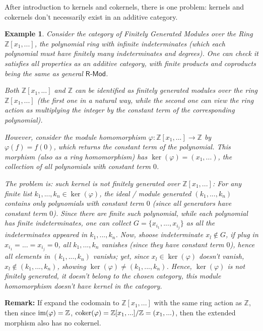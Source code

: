 \documentclass[x11names,reqno,12pt]{extarticle}
\newtheorem{exm}{Example}
\newcommand{\coker}{\textmd{coker}}
\newcommand{\cat}[1]{\textsf{#1}}
\begin{document}
After introduction to kernels and cokernels, there is one problem: kernels and cokernels don't necessarily exist in an additive category.
\begin{exm}
    Consider the category of \emph{Finitely Generated Modules over the Ring $\mathbb{Z}[x_1,...]$}, the polynomial ring with infinite indeterminates (which each polynomial must have finitely many indeterminates and degrees). One can check it satisfies all properties as an additive category, with finite products and coproducts being the same as general $\cat{R-Mod}$.

    \hfil

    Both $\mathbb{Z}[x_1,...]$ and $\mathbb{Z}$ can be identified as finitely generated modules over the ring $\mathbb{Z}[x_1,...]$ (the first one in a natural way, while the second one can view the ring action as multiplying the integer by the constant term of the corresponding polynomial).

    However, consider the module homomorphism $\varphi:\mathbb{Z}[x_1,...]\rightarrow \mathbb{Z}$ by $\varphi(f) = f(0)$, which returns the constant term of the polynomial.
    This morphism (also as a ring homomorphism) has $\ker(\varphi)=(x_1,...)$, the collection of all polynomials with constant term $0$.

    \hfil

    The problem is: such kernel is not finitely generated over $\mathbb{Z}[x_1,...]$: For any finite list $k_1,...,k_n\in \ker(\varphi)$, the ideal / module generated $(k_1,...,k_n)$ contains only polynomials with constant term $0$ (since all generators have constant term $0$). Since there are finite such polynomial, while each polynomial has finite indeterminates, one can collect $G=\{x_{i_1},...,x_{i_j}\}$ as all the indeterminates appeared in $k_1,...,k_n$. Now, shoose indeterminate $x_l\notin G$, if plug in $x_{i_1}=...=x_{i_j}=0$, all $k_1,...,k_n$ vanishes (since they have constant term $0$), hence all elements in $(k_1,...,k_n)$ vanishs; yet, since $x_l \in \ker(\varphi)$ doesn't vanish, $x_l\notin (k_1,...,k_n)$, showing $\ker(\varphi) \neq (k_1,...,k_n)$. Hence, $\ker(\varphi)$ is not finitely generated, it doesn't belong to the chosen category, this module homomorphism doesn't have kernel in the category.
\end{exm}
\textbf{Remark:} If expand the codomain to $\mathbb{Z}[x_1,...]$ with the same ring action as $\mathbb{Z}$, then since $\textmd{im}(\varphi)=\mathbb{Z}$, $\coker(\varphi) = \mathbb{Z}[x_1,...]/\mathbb{Z} = (x_1,...)$, then the extended morphism also has no cokernel.
\end{document}
